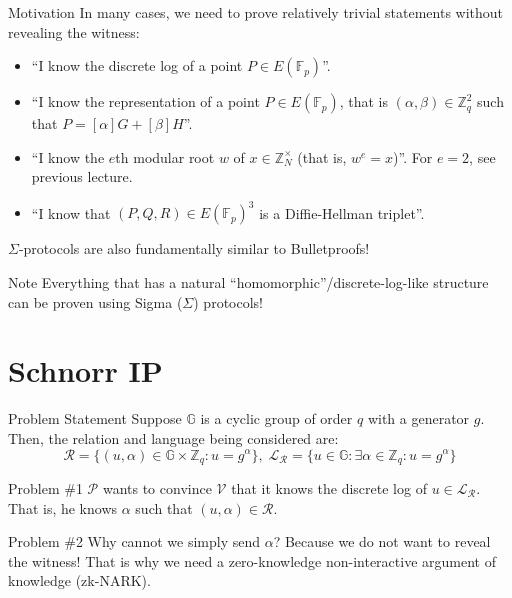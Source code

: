 \documentclass{zkdl-presentation-template}
\begin{document}
    \begin{frame}{Motivation}
        In many cases, we need to prove relatively trivial statements without revealing the witness:
        \begin{itemize}
            \item ``I know the discrete log of a point $P \in E(\mathbb{F}_p)$''.
            \item ``I know the representation of a point $P \in E(\mathbb{F}_p)$, that is $(\alpha,\beta) \in \mathbb{Z}_q^2$ such that $P=[\alpha]G + [\beta]H$''.
            \item ``I know the $e$th modular root $w$ of $x \in \mathbb{Z}_N^{\times}$ (that is, $w^e=x$)''. \textcolor{blue!60!white}{For $e=2$, see previous lecture.}
            \item ``I know that $(P,Q,R) \in E(\mathbb{F}_p)^3$ is a Diffie-Hellman triplet''.
        \end{itemize}

        $\Sigma$-protocols are also fundamentally similar to Bulletproofs!

        \begin{alertblock}{Note}
            Everything that has a natural ``homomorphic''/discrete-log-like structure can be proven using Sigma ($\Sigma$) protocols!
        \end{alertblock}
    \end{frame}

    \section{Schnorr IP}

    \begin{frame}{Problem Statement}
        Suppose $\mathbb{G}$ is a cyclic group of order $q$ with a generator $g$. Then, the relation and language being considered are:
        \begin{equation*}
            \mathcal{R} = \{(u, \alpha) \in \mathbb{G} \times \mathbb{Z}_q: u = g^{\alpha}\}, \; \mathcal{L}_{\mathcal{R}} = \{u \in \mathbb{G}: \exists \alpha \in \mathbb{Z}_q: u = g^{\alpha}\}
        \end{equation*}

        \begin{block}{Problem \#1}
            $\mathcal{P}$ wants to convince $\mathcal{V}$ that it knows the discrete log of $u \in \mathcal{L}_{\mathcal{R}}$. That is, he knows $\alpha$ such that $(u,\alpha) \in \mathcal{R}$.
        \end{block}

        \begin{block}{Problem \#2}
            Why cannot we simply send $\alpha$? Because we do not want to reveal the witness! That is why we need a zero-knowledge non-interactive argument of knowledge (zk-NARK).
        \end{block}
    \end{frame}
\end{document}

